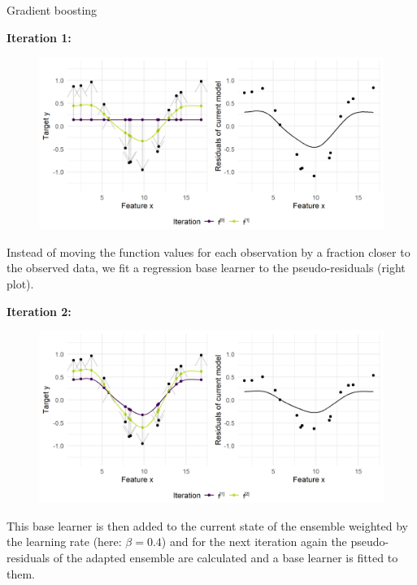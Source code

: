 \begin{vbframe}{Gradient boosting}
\begin{footnotesize}
\vspace*{0.1cm}
\textbf{Iteration 1:}
\begin{figure}
  \includegraphics[width=\textwidth]{figure/fig-gb-concept-idea-1.png}
\end{figure}
\end{footnotesize}
\framebreak
\begin{footnotesize}
Instead of moving the function values for each observation by a fraction closer to the observed data, we fit a regression base learner to the pseudo-residuals (right plot). 


\vspace*{0.1cm}
\textbf{Iteration 2:}
\begin{figure}
  \includegraphics[width=\textwidth]{figure/fig-gb-concept-idea-2.png}
\end{figure}
\end{footnotesize}
\framebreak
\begin{footnotesize}
This base learner is then added to the current state of the ensemble weighted by the learning rate (here: $\beta = 0.4$) and for the next iteration again the pseudo-residuals of the adapted ensemble are calculated and a base learner is fitted to them.



\end{footnotesize}
\end{vbframe}
